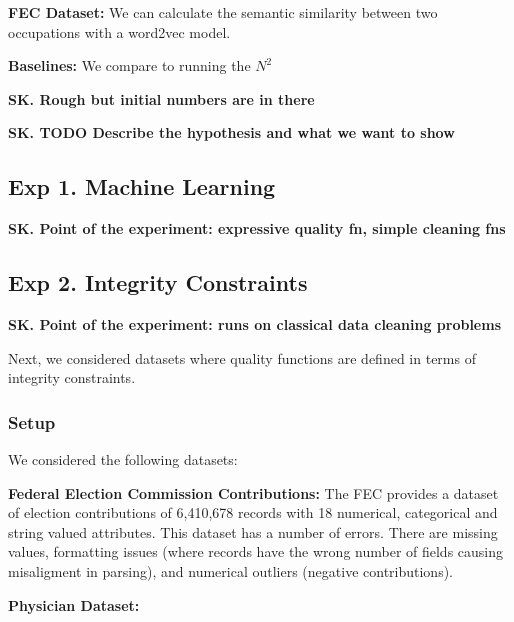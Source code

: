 \vspace{0.5em}\noindent\textbf{FEC Dataset: }  We can calculate the semantic similarity between two occupations with a \textsf{word2vec} model.

\vspace{0.5em}\noindent\textbf{Baselines: } We compare to running the $N^2$ 









\textbf{SK. Rough but initial numbers are in there}

\textbf{SK. TODO Describe the hypothesis and what we want to show}


\subsection*{Exp 1. Machine Learning}
\textbf{SK. Point of the experiment: expressive quality fn, simple cleaning fns}


\subsection*{Exp 2. Integrity Constraints}
\textbf{SK. Point of the experiment: runs on classical data cleaning problems}

Next, we considered datasets where quality functions are defined in terms of integrity constraints.


\subsubsection{Setup}
We considered the following datasets:



\vspace{0.5em}\noindent\textbf{Federal Election Commission Contributions: } The FEC provides a dataset of election contributions of 6,410,678 records with 18 numerical, categorical and string valued attributes. This dataset has a number of errors. There are missing values, formatting issues (where records have the wrong number of fields causing misaligment in parsing), and numerical outliers (negative contributions).

\vspace{0.5em}\noindent\textbf{Physician Dataset: }


